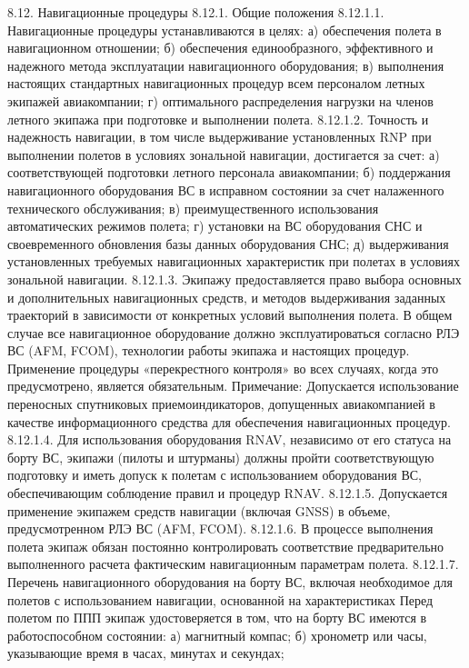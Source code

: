 8.12.	Навигационные процедуры
8.12.1. Общие положения
8.12.1.1. Навигационные процедуры устанавливаются в целях: 
а)	обеспечения полета в навигационном отношении;
б)	обеспечения единообразного, эффективного и надежного метода эксплуатации навигационного оборудования;
в)	выполнения настоящих стандартных навигационных процедур всем персоналом летных экипажей авиакомпании;
г)	оптимального распределения нагрузки на членов летного экипажа при подготовке и выполнении полета.
8.12.1.2. Точность и надежность навигации, в том числе выдерживание установленных RNP при выполнении полетов в условиях зональной навигации, достигается за счет:
а)	соответствующей подготовки летного персонала авиакомпании;
б)	поддержания навигационного оборудования ВС в исправном состоянии за счет налаженного технического обслуживания;
в)	преимущественного использования автоматических режимов полета;
г)	установки на ВС оборудования СНС и своевременного обновления базы данных оборудования СНС;
д)	выдерживания установленных требуемых навигационных характеристик при полетах в условиях зональной навигации.
8.12.1.3. Экипажу предоставляется право выбора основных и дополнительных навигационных средств, и методов выдерживания заданных траекторий в зависимости от конкретных условий выполнения полета. В общем случае все навигационное оборудование должно эксплуатироваться согласно РЛЭ ВС (AFM, FCOM), технологии работы экипажа и настоящих процедур. Применение процедуры «перекрестного контроля» во всех случаях, когда это предусмотрено, является обязательным. 
Примечание: Допускается использование переносных спутниковых приемоиндикаторов, допущенных авиакомпанией в качестве информационного средства для обеспечения навигационных процедур. 
8.12.1.4. Для использования оборудования RNAV, независимо от его статуса на борту ВС, экипажи (пилоты и штурманы) должны пройти соответствующую подготовку и иметь допуск к полетам с использованием оборудования ВС, обеспечивающим соблюдение правил и процедур RNAV. 
8.12.1.5. Допускается применение экипажем средств навигации (включая GNSS) в объеме, предусмотренном РЛЭ ВС (AFM, FCOM).
8.12.1.6. В процессе выполнения полета экипаж обязан постоянно контролировать соответствие предварительно выполненного расчета фактическим навигационным параметрам полета.
8.12.1.7.	Перечень навигационного оборудования на борту ВС, включая необходимое для полетов с использованием навигации, основанной на характеристиках
Перед полетом по ППП экипаж удостоверяется в том, что на борту ВС имеются в работоспособном состоянии:
а)	магнитный компас;
б)	хронометр или часы, указывающие время в часах, минутах и секундах;
